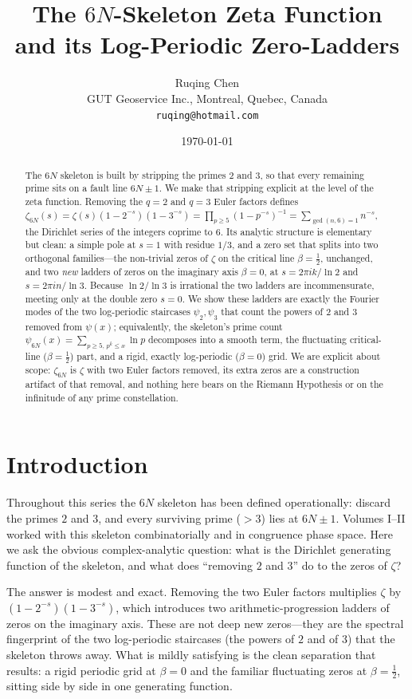 \documentclass[11pt,a4paper]{article}
\title{\Large \textbf{The $6N$-Skeleton Zeta Function\\
and its Log-Periodic Zero-Ladders}}
\author{Ruqing Chen\\
\small GUT Geoservice Inc., Montreal, Quebec, Canada\\
\small \texttt{ruqing@hotmail.com}}
\date{\today}
\begin{document}
\maketitle

\begin{abstract}
The $6N$ skeleton is built by stripping the primes $2$ and $3$, so that every
remaining prime sits on a fault line $6N\pm1$. We make that stripping explicit at
the level of the zeta function. Removing the $q=2$ and $q=3$ Euler factors defines
$\zeta_{6N}(s)=\zeta(s)(1-2^{-s})(1-3^{-s})=\prod_{p\ge5}(1-p^{-s})^{-1}
=\sum_{\gcd(n,6)=1}n^{-s}$, the Dirichlet series of the integers coprime to $6$. Its
analytic structure is elementary but clean: a simple pole at $s=1$ with residue
$1/3$, and a zero set that splits into two orthogonal families---the non-trivial
zeros of $\zeta$ on the critical line $\beta=\tfrac12$, unchanged, and two
\emph{new} ladders of zeros on the imaginary axis $\beta=0$, at $s=2\pi i k/\ln 2$
and $s=2\pi i n/\ln 3$. Because $\ln2/\ln3$ is irrational the two ladders are
incommensurate, meeting only at the double zero $s=0$. We show these ladders are
exactly the Fourier modes of the two log-periodic staircases $\psi_2,\psi_3$ that
count the powers of $2$ and $3$ removed from $\psi(x)$; equivalently, the
skeleton's prime count $\psi_{6N}(x)=\sum_{p\ge5,\,p^k\le x}\ln p$ decomposes into a
smooth term, the fluctuating critical-line ($\beta=\tfrac12$) part, and a rigid,
exactly log-periodic ($\beta=0$) grid. We are explicit about scope: $\zeta_{6N}$ is
$\zeta$ with two Euler factors removed, its extra zeros are a construction artifact
of that removal, and nothing here bears on the Riemann Hypothesis or on the
infinitude of any prime constellation.
\end{abstract}

\section{Introduction}
Throughout this series the $6N$ skeleton has been defined operationally: discard the
primes $2$ and $3$, and every surviving prime ($>3$) lies at $6N\pm1$. Volumes I--II
worked with this skeleton combinatorially and in congruence phase space. Here we ask
the obvious complex-analytic question: what is the Dirichlet generating function of
the skeleton, and what does ``removing $2$ and $3$'' do to the zeros of $\zeta$?

The answer is modest and exact. Removing the two Euler factors multiplies $\zeta$ by
$(1-2^{-s})(1-3^{-s})$, which introduces two arithmetic-progression ladders of
zeros on the imaginary axis. These are not deep new zeros---they are the spectral
fingerprint of the two log-periodic staircases (the powers of $2$ and of $3$) that
the skeleton throws away. What is mildly satisfying is the clean separation that
results: a rigid periodic grid at $\beta=0$ and the familiar fluctuating zeros at
$\beta=\tfrac12$, sitting side by side in one generating function.
\end{document}
